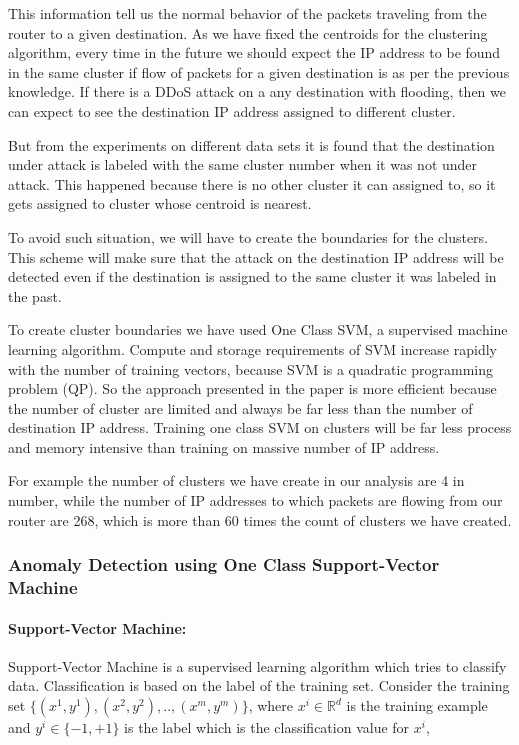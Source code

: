 \documentclass[10pt,oneside,a4paper]{article}
\begin{document}
This information tell us the normal behavior of the packets traveling from the router to a given destination. As we have fixed the centroids for the clustering algorithm, every time in the future we should expect the IP address to be found in the same cluster if flow of packets for a given destination is as per the previous knowledge. If there is a DDoS attack on a any destination with flooding, then we can expect to see the destination IP address assigned to different cluster.

But from the experiments on different data sets it is found that the destination under attack is labeled with the same cluster number when it was not under attack. This happened because there is no other cluster it can assigned to, so it gets assigned to cluster whose centroid is nearest.

To avoid such situation, we will have to create the boundaries for the clusters. This scheme will make sure that the attack on the destination IP address will be detected even if the destination is assigned to the same cluster it was labeled in the past.

To create cluster boundaries we have used One Class SVM, a supervised machine learning algorithm. Compute and storage requirements of SVM increase rapidly with the number of training vectors, because SVM is a quadratic programming problem (QP). So the approach presented in the paper is more efficient because the number of cluster are limited and always be far less than the number of destination IP address. Training one class SVM on clusters will be far less process and memory intensive than training on massive number of IP address.

For example the number of clusters we have create in our analysis are 4 in number, while the number of IP addresses to which packets are flowing from our router are 268, which is more than 60 times the count of clusters we have created.

\subsubsection{Anomaly Detection using One Class Support-Vector Machine}

\paragraph{Support-Vector Machine:}

Support-Vector Machine is a supervised learning algorithm which tries to classify data. Classification is based on the label of the training set. Consider the training set $\{(x^{1},y^{1}),(x^{2},y^{2}), .., (x^{m},y^{m})\}$, where $x^{i} \in \mathbb{R}^d$ is the training example and $y^{i} \in \{-1, +1\}$ is the label which is the classification value for $x^{i}$,
\end{document}
